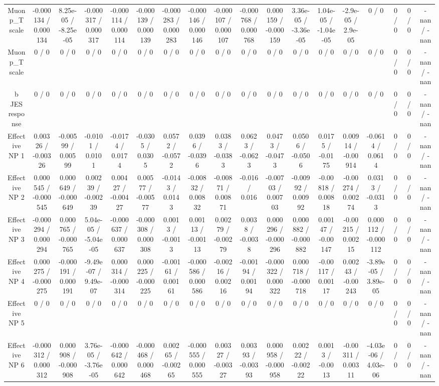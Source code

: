\documentclass[10pt]{article}
\begin{document}
\begin{table}[htbp]
\begin{center}
\begin{tabular}{|c|c|c|c|c|c|c|c|c|c|c|c|c|c|c|c|c|c|}
  Muon p_{T} scale & -0.000134 / 0.000134 & 8.25e-05 / -8.25e-05 & -0.000317 / 0.000317 & -0.000114 / 0.000114 & -0.000139 / 0.000139 & -0.000283 / 0.000283 & -0.000146 / 0.000146 & -0.000107 / 0.000107 & -0.000768 / 0.000768 & 0.000159 / -0.000159 & 3.36e-05 / -3.36e-05 & 1.04e-05 / -1.04e-05 & -2.9e-05 / 2.9e-05 & 0 / 0 & 0 / 0 & 0 / 0 & -nan / -nan \\ 
  Muon p_{T} scale & 0 / 0 & 0 / 0 & 0 / 0 & 0 / 0 & 0 / 0 & 0 / 0 & 0 / 0 & 0 / 0 & 0 / 0 & 0 / 0 & 0 / 0 & 0 / 0 & 0 / 0 & 0 / 0 & 0 / 0 & 0 / 0 & -nan / -nan \\ 
  b JES response & 0 / 0 & 0 / 0 & 0 / 0 & 0 / 0 & 0 / 0 & 0 / 0 & 0 / 0 & 0 / 0 & 0 / 0 & 0 / 0 & 0 / 0 & 0 / 0 & 0 / 0 & 0 / 0 & 0 / 0 & 0 / 0 & -nan / -nan \\ 
  Effective NP 1 & 0.00326 / -0.00326 & -0.00599 / 0.00599 & -0.0101 / 0.0101 & -0.0174 / 0.0174 & -0.0305 / 0.0305 & 0.0572 / -0.0572 & 0.0396 / -0.0396 & 0.0383 / -0.0383 & 0.0623 / -0.0623 & 0.0473 / -0.0473 & 0.0506 / -0.0506 & 0.0175 / -0.0175 & 0.00914 / -0.00914 & -0.0614 / 0.0614 & 0 / 0 & 0 / 0 & -nan / -nan \\ 
  Effective NP 2 & 0.000545 / -0.000545 & 0.000649 / -0.000649 & 0.00239 / -0.00239 & 0.00427 / -0.00427 & 0.00577 / -0.00577 & -0.0143 / 0.0143 & -0.00832 / 0.00832 & -0.00871 / 0.00871 & -0.016 / 0.016 & -0.00703 / 0.00703 & -0.00992 / 0.00992 & -0.00818 / 0.00818 & -0.00274 / 0.00274 & 0.0313 / -0.0313 & 0 / 0 & 0 / 0 & -nan / -nan \\ 
  Effective NP 3 & -0.000294 / 0.000294 & 0.000765 / -0.000765 & 5.04e-05 / -5.04e-05 & -0.000637 / 0.000637 & -0.000308 / 0.000308 & 0.0013 / -0.0013 & 0.00113 / -0.00113 & 0.00279 / -0.00279 & 0.0038 / -0.0038 & 0.000296 / -0.000296 & 0.000882 / -0.000882 & 0.00147 / -0.00147 & -0.00215 / 0.00215 & 0.000112 / -0.000112 & 0 / 0 & 0 / 0 & -nan / -nan \\ 
  Effective NP 4 & 0.000275 / -0.000275 & -0.000191 / 0.000191 & -9.49e-07 / 9.49e-07 & 0.000314 / -0.000314 & 0.000225 / -0.000225 & -0.00161 / 0.00161 & -0.000586 / 0.000586 & -0.00216 / 0.00216 & -0.00194 / 0.00194 & -0.000322 / 0.000322 & 0.000718 / -0.000718 & -0.00117 / 0.00117 & 0.00243 / -0.00243 & -3.89e-05 / 3.89e-05 & 0 / 0 & 0 / 0 & -nan / -nan \\ 
  Effective NP 5 & 0 / 0 & 0 / 0 & 0 / 0 & 0 / 0 & 0 / 0 & 0 / 0 & 0 / 0 & 0 / 0 & 0 / 0 & 0 / 0 & 0 / 0 & 0 / 0 & 0 / 0 & 0 / 0 & 0 / 0 & 0 / 0 & -nan / -nan \\ 
  Effective NP 6 & -0.000312 / 0.000312 & 0.000908 / -0.000908 & 3.76e-05 / -3.76e-05 & -0.000642 / 0.000642 & -0.000468 / 0.000468 & 0.00265 / -0.00265 & -0.000555 / 0.000555 & 0.00327 / -0.00327 & 0.00393 / -0.00393 & 0.000958 / -0.000958 & 0.00222 / -0.00222 & 0.0013 / -0.0013 & -0.00311 / 0.00311 & -4.03e-06 / 4.03e-06 & 0 / 0 & 0 / 0 & -nan / -nan \\ 

\end{tabular}
\end{center}
\end{table}
\end{document}
